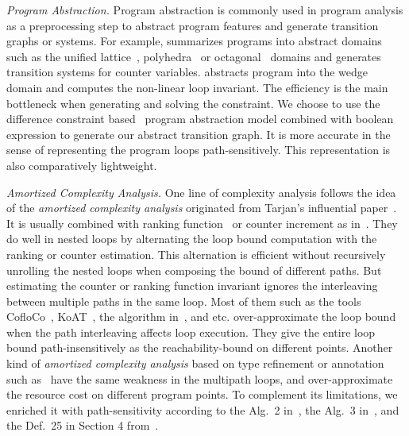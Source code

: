 \emph{Program Abstraction.}
Program abstraction is commonly used in program analysis as a preprocessing step to abstract program features and generate transition graphs or systems. For example, \cite{GulwaniZ10} summarizes programs into abstract domains such as the unified lattice~\cite{CousotH78}, polyhedra~\cite{CousotC77} or octagonal~\cite{Mine06} domains and generates transition systems for counter variables.
\cite{KincaidCBR18} abstracts program into the wedge domain and computes the non-linear loop invariant.
The efficiency is the main bottleneck when generating and solving the constraint.
We choose to use the difference constraint based~\cite{SinnZV17,SinnZV14} program abstraction model combined with boolean expression to generate our abstract transition graph.
It is more accurate in the sense of representing the program loops path-sensitively. This representation is also comparatively lightweight.

\emph{Amortized Complexity Analysis.}
One line of complexity analysis follows the idea of the \emph{amortized complexity analysis} originated from Tarjan's influential paper~\cite{PotechinP17}. It is usually combined with ranking function~\cite{BradleyMS05,CookSZ13,Zuleger18} or counter increment as in~\cite{ZulegerGSV11,SinnZV14,SinnZV17,LuCT21,AliasDFG10}.
They do well in nested loops by alternating the loop bound computation with the ranking or counter estimation. This alternation is efficient without recursively unrolling the nested loops when composing the bound of different paths.
  But estimating the counter or ranking function invariant ignores the interleaving between multiple paths in the same loop.
Most of them such as the tools CofloCo~\cite{Montoya17,Flores-MontoyaH14,Flores-Montoya16}, KoAT~\cite{BrockschmidtEFFG16,BrockschmidtEFFG14,FalkeKS12,FalkeKS11}, the algorithm in~\cite{LuCT21}, and etc. over-approximate the loop bound when the path interleaving affects loop execution. They give the entire loop bound path-insensitively as the reachability-bound on different points. Another kind of \emph{amortized complexity analysis} based on type refinement or annotation such as~\cite{CraryW00,JostHLH10,CicekBG0H17,RajaniG0021,CarbonneauxHS15} have the same weakness in the multipath loops, and over-approximate the resource cost on different program points.
To complement its limitations, we enriched it with path-sensitivity according to the Alg.~2 in~\cite{SinnZV14},
the Alg.~3 in~\cite{ZulegerGSV11},
and the Def.~25 in Section 4 from~\cite{SinnZV17}.

